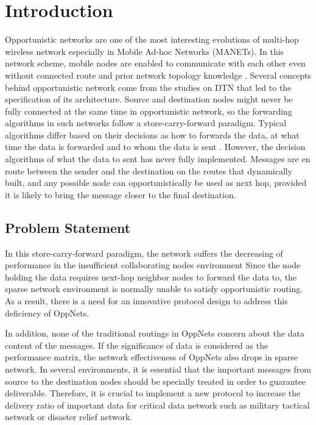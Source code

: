 \chapter{Introduction}
\label{intro}

Opportunistic networks are one of the most interesting evolutions of multi-hop wireless network especially in Mobile Ad-hoc Networks (MANETs). 
In this network scheme, mobile nodes are enabled to communicate with each other even without connected route and prior network topology knowledge \cite{Pelusi2006}.
Several concepts behind opportunistic network come from the studies on DTN that led to the specification of its architecture. 
Source and destination nodes might never be fully connected at the same time in opportunistic network, so the forwarding algorithms in such networks follow a store-carry-forward paradigm. Typical algorithms differ based on their decisions as how to forwards the data, at what time the data is forwarded and to whom the data is sent \cite{Joe2010}. 
However, the decision algorithms of what the data to sent has never fully implemented. 
Messages are en route between the sender and the destination on the routes that dynamically built, and any possible node can opportunistically be used as next hop, provided it is likely to bring the message closer to the final destination.
\section{Problem Statement}
\label{intro:Problem Statement}
In this store-carry-forward paradigm, the network suffers the decreasing of performance in the insufficient collaborating nodes environment \cite{Nousiainen2013,Spyropoulos2010}
Since the node holding the data requires next-hop neighbor nodes to forward the data to, the sparse network environment is normally unable to satisfy opportunistic routing.
As a result, there is a need for an innovative protocol design to address this deficiency of OppNets.

In addition, none of the traditional routings in OppNets concern about the data content of the messages. 
If the significance of data is considered as the performance matrix, the network effectiveness of OppNets also drops in sparse network. 
In several environments, it is essential that the important messages from source to the destination nodes should be specially treated in order to guarantee deliverable.
Therefore, it is crucial to implement a new protocol to increase the delivery ratio of important data for critical data network such as military tactical network or disaster relief network.

